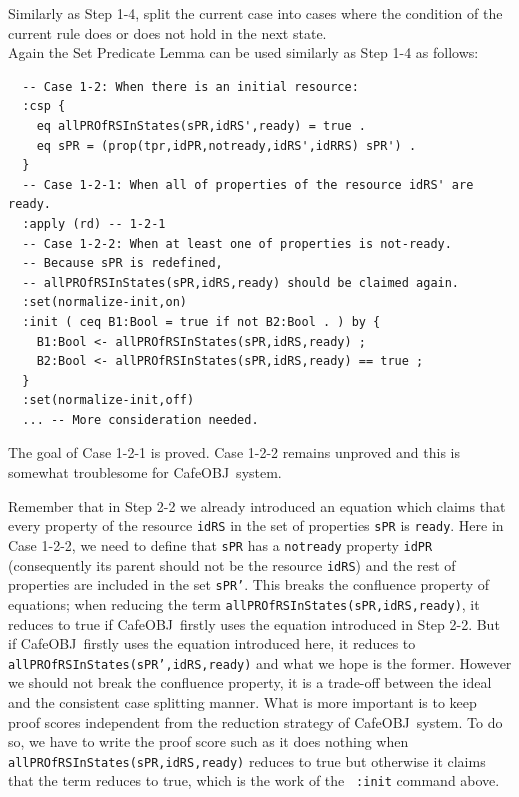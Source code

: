 \documentclass[12pt]{report}
\newcommand{\stt}[1]{{\small{\tt {#1}}}}
\newcommand{\cafeobj}{{\sf CafeOBJ}~}
\begin{document}
 Similarly as Step 1-4, split the current case
into cases where the condition of the current rule does or does not
hold in the next state. \\
Again the Set Predicate Lemma can be used similarly as Step 1-4 as follows:
\small
\begin{verbatim}
  -- Case 1-2: When there is an initial resource:
  :csp {
    eq allPROfRSInStates(sPR,idRS',ready) = true .
    eq sPR = (prop(tpr,idPR,notready,idRS',idRRS) sPR') .
  }
  -- Case 1-2-1: When all of properties of the resource idRS' are ready.
  :apply (rd) -- 1-2-1
  -- Case 1-2-2: When at least one of properties is not-ready.
  -- Because sPR is redefined, 
  -- allPROfRSInStates(sPR,idRS,ready) should be claimed again.
  :set(normalize-init,on)
  :init ( ceq B1:Bool = true if not B2:Bool . ) by {
    B1:Bool <- allPROfRSInStates(sPR,idRS,ready) ;
    B2:Bool <- allPROfRSInStates(sPR,idRS,ready) == true ;
  }
  :set(normalize-init,off)
  ... -- More consideration needed.
\end{verbatim}
\normalsize
The goal of Case 1-2-1 is proved. Case 1-2-2 remains unproved and this
is somewhat troublesome for \cafeobj system.

Remember that in Step 2-2 we already introduced an equation which
claims that every property of the resource {\tt idRS} in the set of
properties {\tt sPR} is {\tt ready}. Here in Case 1-2-2, we need to
define that {\tt sPR} has a {\tt notready} property {\tt idPR}
(consequently its parent should not be the resource {\tt idRS}) and
the rest of properties are included in the set {\tt sPR'}. This breaks
the confluence property of equations; when reducing the term
\stt{allPROfRSInStates(sPR,idRS,ready)}, it reduces to true if
\cafeobj firstly uses the equation introduced in Step 2-2. But if
\cafeobj firstly uses the equation introduced here, it reduces to
\stt{allPROfRSInStates(sPR',idRS,ready)} and what we hope is the
former. However we should not break the confluence property, it is a
trade-off between the ideal and the consistent case splitting manner.
What is more important is to keep proof scores independent from the
reduction strategy of \cafeobj system. To do so, we have to write the
proof score such as it does nothing when
\stt{allPROfRSInStates(sPR,idRS,ready)} reduces to true but otherwise
it claims that the term reduces to true, which is the work of the {\tt
  :init} command above.
\end{document}
